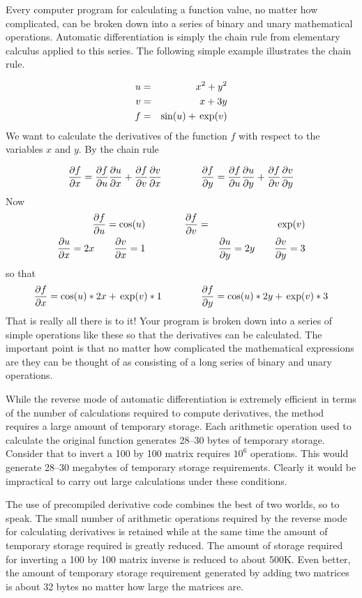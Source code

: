 \documentclass[12pt]{book}
\begin{document}

Every computer program for calculating a function value, no
matter how complicated, can be broken down into a series of
binary and unary mathematical operations. Automatic differentiation
is simply the chain rule from elementary calculus applied to this 
series. The following simple example illustrates the chain rule.

 \begin{eqnarray}
   u&=&x^2+y^2\cr
            v&=&x+3y\cr
            f&=&\sin(u)+\exp(v) 
 \end{eqnarray}
\bestbreak
We want to calculate the derivatives of the function $f$ with
respect to the variables $x$ and $y$. By the chain rule
\def\pd#1#2{{\partial #1\over\partial #2}}

$$\pd fx=\pd fu\pd ux + \pd fv\pd vx\qquad\qquad
          \pd fy=\pd fu\pd uy + \pd fv\pd vy$$
Now
 \begin{eqnarray}
\pd fu=\cos(u)\qquad&\qquad\pd fv=&\exp(v)\cr
           \pd ux=2x\qquad\pd vx=1\qquad&\qquad&
           \pd uy=2y\qquad\pd vy=3
 \end{eqnarray}
\noindent so that
$$\pd fx=\cos(u)*2x+\exp(v)*1\qquad\qquad\pd fy=\cos(u)*2y+\exp(v)*3$$
\noindent That is really all there is to it! Your program is
broken down into a series of simple operations like these
so that the derivatives can be calculated. The important
point is that no matter how complicated the
mathematical expressions are they can be thought of
as consisting of a long series of binary and unary operations.


While the reverse mode of automatic differentiation is
extremely efficient in terms of the number of calculations
required to compute derivatives, the method requires a
large amount of temporary storage. Each arithmetic operation 
used to calculate the original function generates 28--30 bytes
of temporary storage. Consider that to invert a 100 by 100
matrix requires $10^6$ operations. This would generate
28--30 megabytes of temporary storage requirements. Clearly
it would be impractical to carry out large calculations under 
these conditions. 

The use of precompiled derivative code combines the best of two
worlds, so to speak. The small number of arithmetic operations
required by the reverse mode for calculating derivatives is
retained while at the same time  the amount of temporary storage
required is greatly reduced. The amount of storage required for inverting
a 100 by 100 matrix inverse is reduced to about 500K. Even better,
the amount of temporary storage requirement generated
by adding two matrices is about 32 bytes no matter how large
the matrices are.
\end{document}
